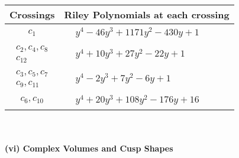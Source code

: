 \documentclass[1p]{elsarticle_modified}
\theoremstyle{definition}
\begin{document}
\begin{tabular}{m{50pt}|m{274pt}}
Crossings & \hspace{64pt}Riley Polynomials at each crossing \\
\hline $$\begin{aligned}c_{1}\end{aligned}$$&$\begin{aligned}
&y^4-46 y^3+1171 y^2-430 y+1
\end{aligned}$\\
\hline $$\begin{aligned}c_{2},c_{4},c_{8}\\c_{12}\end{aligned}$$&$\begin{aligned}
&y^4+10 y^3+27 y^2-22 y+1
\end{aligned}$\\
\hline $$\begin{aligned}c_{3},c_{5},c_{7}\\c_{9},c_{11}\end{aligned}$$&$\begin{aligned}
&y^4-2 y^3+7 y^2-6 y+1
\end{aligned}$\\
\hline $$\begin{aligned}c_{6},c_{10}\end{aligned}$$&$\begin{aligned}
&y^4+20 y^3+108 y^2-176 y+16
\end{aligned}$\\
\hline
\end{tabular}\\~\\
\newpage\flushleft \textbf{(vi) Complex Volumes and Cusp Shapes}
\end{document}
